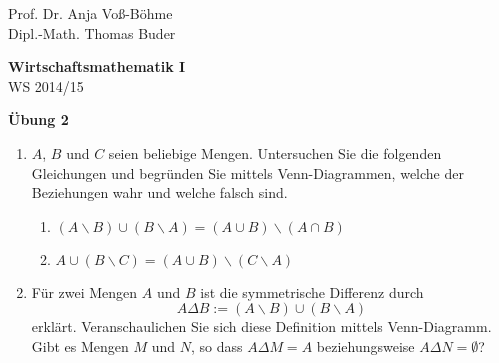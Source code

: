 \documentclass[12pt,a4paper]{scrreprt}
\begin{document}
 
\begin{flushleft}
Prof. Dr. Anja Voß-Böhme \\
Dipl.-Math. Thomas Buder
\end{flushleft}

\begin{center}
\large{\textbf{ Wirtschaftsmathematik I}} \\
WS 2014/15 \end{center}

\begin{center}\large{\textbf{ Übung 2 }} \end{center}

\bigskip
\begin{enumerate}
 			
		 \item $A$, $B$ und $C$ seien beliebige Mengen. Untersuchen Sie die folgenden 							Gleichungen und begründen Sie mittels Venn-Diagrammen, welche der 									Beziehungen wahr und welche falsch sind.
		 				\begin{enumerate}
		 				\item $(A \backslash B) \cup (B \backslash A) = (A \cup B) \backslash (A                    \cap B)$
						\item $A \cup (B \backslash C) = (A \cup B) \backslash (C \backslash A)$
					\end{enumerate}
								\item Für zwei Mengen $A$ und $B$ ist die symmetrische Differenz     
								durch
						\[A \Delta B := (A \backslash B) \cup (B \backslash A)\]
						erklärt. Veranschaulichen Sie sich diese Definition mittels 
						Venn-Diagramm. 
						Gibt es Mengen $M$ und $N$, so dass $A\Delta M = A$ 
						beziehungsweise $A \Delta N = \emptyset$?		
					

\end{enumerate}
\end{document}
